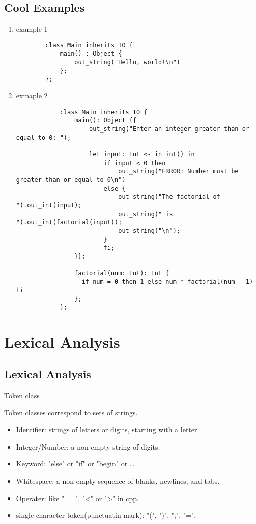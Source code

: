 \documentclass[11pt]{report}
\begin{document}
    \section{Cool Examples}
    \begin{enumerate}
        \item example 1
        \begin{lstlisting}
        class Main inherits IO {
            main() : Object {
                out_string("Hello, world!\n")
            };
        };
        \end{lstlisting}
        \item  exmaple 2
        \begin{lstlisting}
            class Main inherits IO {
                main(): Object {{
                    out_string("Enter an integer greater-than or equal-to 0: ");
              
                    let input: Int <- in_int() in
                        if input < 0 then
                            out_string("ERROR: Number must be greater-than or equal-to 0\n")
                        else {
                            out_string("The factorial of ").out_int(input);
                            out_string(" is ").out_int(factorial(input));
                            out_string("\n");
                        }
                        fi;
                }};
              
                factorial(num: Int): Int {
                  if num = 0 then 1 else num * factorial(num - 1) fi
                };
            };
        \end{lstlisting}
    \end{enumerate}    

    \newpage
    \chapter{Lexical Analysis}
    \section{Lexical Analysis}
    \textcolor{stanfordred}{Token class}

    Token classes correspond to sets of strings.

    \begin{itemize}
        \item \textcolor{stanfordred}{Identifier}: strings of letters or digits, starting with a letter.
        \item \textcolor{stanfordred}{Integer/Number}: a non-empty string of digits.
        \item \textcolor{stanfordred}{Keyword}: "else" or "if" or "begin" or \dots
        \item \textcolor{stanfordred}{Whitespace}: a non-empty sequence of blanks, newlines, and tabs.
        \item \textcolor{stanfordred}{Operater}: like "==", "<" or ">" in cpp.
        \item \textcolor{stanfordred}{single character token(punctuatin mark)}: "(", ")", ";", "=".
    \end{itemize}
\end{document}
